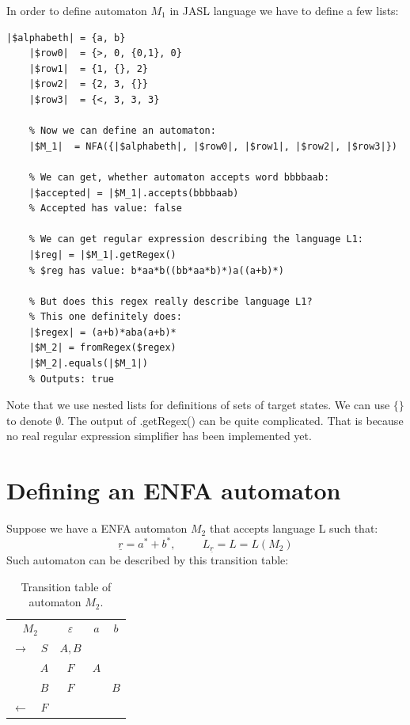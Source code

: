 \documentclass{ctuthesis}
\begin{document}
In order to define automaton $M_1$ in JASL language we have to define a few lists: 

\begin{minipage}{\linewidth}
\begin{lstlisting}[language = JASL]
	|$alphabeth| = {a, b}
	|$row0|  = {>, 0, {0,1}, 0}
	|$row1|  = {1, {}, 2}
	|$row2|  = {2, 3, {}}
	|$row3|  = {<, 3, 3, 3}
    
	% Now we can define an automaton:
	|$M_1|  = NFA({|$alphabeth|, |$row0|, |$row1|, |$row2|, |$row3|})

	% We can get, whether automaton accepts word bbbbaab:
	|$accepted| = |$M_1|.accepts(bbbbaab)   
	% Accepted has value: false 
	
	% We can get regular expression describing the language L1:
	|$reg| = |$M_1|.getRegex()
	% $reg has value: b*aa*b((bb*aa*b)*)a((a+b)*) 

	% But does this regex really describe language L1? 
	% This one definitely does:
	|$regex| = (a+b)*aba(a+b)*
	|$M_2| = fromRegex($regex)
	|$M_2|.equals(|$M_1|) 	
	% Outputs: true
\end{lstlisting}
\end{minipage}

Note that we use nested lists for definitions of sets of target states. We can use $\{\}$ to denote $\emptyset$. The output of .getRegex() can be quite complicated. That is because no real regular expression simplifier has been implemented yet.

\section{Defining an ENFA automaton}
\label{sec:example_ENFA}
Suppose we have a ENFA automaton $M_2$ that accepts language L such that:
\begin{equation*}
	\underline{r} = a^*+b^*, \hspace{1cm} L_{\underline{r}} = L = L(M_2) 
\end{equation*}
Such automaton can be described by this transition table:
\begin{table}[H]
\begin{ctucolortab}
\begin{tabular}{cc|ccc}
\multicolumn{2}{c}{$M_2$} & $\varepsilon$ & $a$ & $b$ \\\Midrule
$\rightarrow$ 	& $S$ & $A,B$  \\
				& $A$ & $F$ 	& $A$  \\
				& $B$ & $F$		& & $B$ \\
$\leftarrow$	& $F$ & 		&  
\end{tabular}
\end{ctucolortab}
\caption{Transition table of automaton $M_2$.}
\label{fig:examples_DFA_table}
\end{table} 
\end{document}
